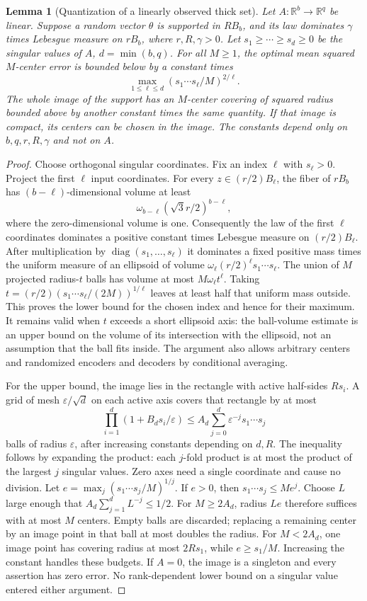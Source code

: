 \documentclass[11pt]{amsart}
\newtheorem{lemma}[theorem]{Lemma}
\theoremstyle{definition}\newtheorem{definition}[theorem]{Definition}
\theoremstyle{remark}\newtheorem{remark}[theorem]{Remark}
\newcommand{\R}{\mathbb R}\newcommand{\N}{\mathbb N}\newcommand{\C}{\mathbb C}
\begin{document}
\begin{lemma}[Quantization of a linearly observed thick set]
\label{lem:v18-thick-linear}
Let $A:\R^b\to\R^q$ be linear. Suppose a random vector $\theta$ is
supported in $RB_b$, and its law dominates $\gamma$ times Lebesgue
measure on $rB_b$, where $r,R,\gamma>0$. Let $s_1\ge\cdots\ge s_d\ge0$
be the singular values of $A$, $d=\min(b,q)$. For all $M\ge1$, the
optimal mean squared $M$-center error is bounded below by a constant
times
\[
 \max_{1\le\ell\le d}(s_1\cdots s_\ell/M)^{2/\ell}.
\]
The whole image of the support has an $M$-center covering of squared
radius bounded above by another constant times the same quantity.
If that image is compact, its centers can be chosen in the image.
The constants depend only on $b,q,r,R,\gamma$ and not on $A$.
\end{lemma}
\begin{proof}
Choose orthogonal singular coordinates. Fix an index $\ell$ with
$s_\ell>0$. Project the first $\ell$ input coordinates. For every
$z\in(r/2)B_\ell$, the fiber of $rB_b$ has
$(b-\ell)$-dimensional volume at least
\[
 \omega_{b-\ell}(\sqrt3r/2)^{b-\ell},
\]
where the zero-dimensional volume is one. Consequently the law of
the first $\ell$ coordinates dominates a positive constant times
Lebesgue measure on $(r/2)B_\ell$. After multiplication by
$\operatorname{diag}(s_1,\ldots,s_\ell)$ it dominates a fixed positive
mass times the uniform measure of an ellipsoid of volume
$\omega_\ell(r/2)^\ell s_1\cdots s_\ell$. The union of $M$
projected radius-$t$ balls has volume at most $M\omega_\ell t^\ell$.
Taking $t=(r/2)(s_1\cdots s_\ell/(2M))^{1/\ell}$ leaves at least
half that uniform mass outside. This proves the lower bound for the
chosen index and hence for their maximum. It remains valid when $t$
exceeds a short ellipsoid axis: the ball-volume estimate is an upper
bound on the volume of its intersection with the ellipsoid, not an
assumption that the ball fits inside. The argument also allows arbitrary
centers and randomized encoders and decoders by conditional averaging.

For the upper bound, the image lies in the rectangle with active
half-sides $Rs_i$. A grid of mesh $\varepsilon/\sqrt d$ on each active
axis covers that rectangle by at most
\[
 \prod_{i=1}^d(1+B_ds_i/\varepsilon)
 \le A_d\sum_{j=0}^d\varepsilon^{-j}s_1\cdots s_j
\]
balls of radius $\varepsilon$, after increasing constants depending
on $d,R$. The inequality follows by expanding the product: each
$j$-fold product is at most the product of the largest $j$ singular
values. Zero axes need a single coordinate and cause no division.
Let $e=\max_j(s_1\cdots s_j/M)^{1/j}$. If $e>0$, then
$s_1\cdots s_j\le Me^j$. Choose $L$ large enough that
$A_d\sum_{j=1}^dL^{-j}\le1/2$. For $M\ge2A_d$, radius $Le$
therefore suffices with at most $M$ centers. Empty balls are discarded;
replacing a remaining center by an image point in that ball at most
doubles the radius. For $M<2A_d$, one image point has covering radius
at most $2Rs_1$, while $e\ge s_1/M$. Increasing the constant handles
these budgets. If $A=0$, the image is a singleton and every assertion
has zero error. No rank-dependent lower bound on a singular value
entered either argument.
\end{proof}
\end{document}
